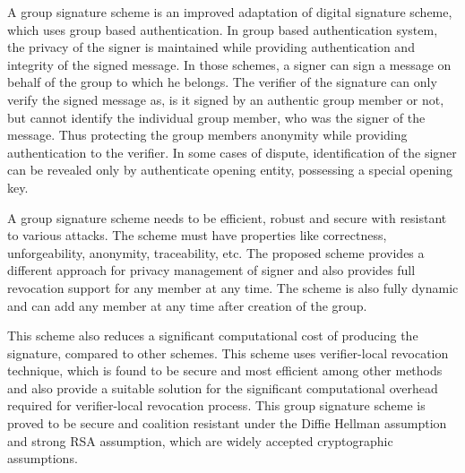 A group signature scheme is an improved adaptation of digital signature scheme, which uses group based authentication. In group based authentication system, the privacy of the signer is maintained while providing authentication and integrity of the signed message. In those schemes, a signer can sign a message on behalf of the group to which he belongs. The verifier of the signature can only verify the signed message as, is it signed by an authentic group member or not, but cannot identify the individual group member, who was the signer of the message. Thus protecting the group members anonymity while providing authentication to the verifier. In some cases of dispute, identification of the signer can be revealed only by authenticate opening entity, possessing a special opening key.
 
A group signature scheme needs to be efficient, robust and secure with resistant to various attacks. The scheme must have properties like correctness, unforgeability, anonymity, traceability, etc. The proposed scheme provides a different approach for privacy management of signer and also provides full revocation support for any member at any time. The scheme is also fully dynamic and can add any member at any time after creation of the group. 
 
This scheme also reduces a significant computational cost of producing the signature, compared to other schemes. This scheme uses verifier-local revocation technique, which is found to be secure and most efficient among other methods and also provide a suitable solution for the significant computational overhead required for verifier-local revocation process. This group signature scheme is proved to be secure and coalition resistant under the Diffie Hellman assumption and strong RSA assumption, which are widely accepted cryptographic assumptions.